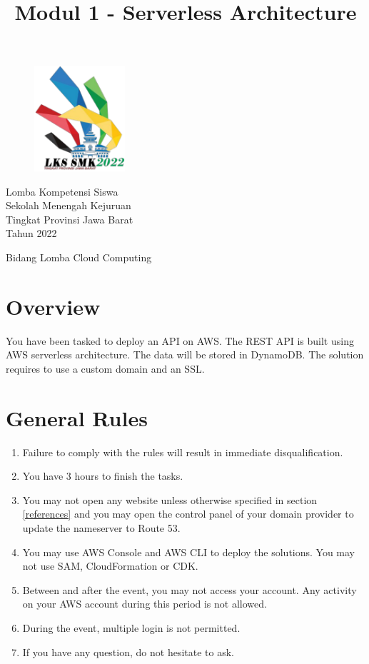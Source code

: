 \documentclass{article}
\title{Modul 1 - Serverless Architecture}
\author{}
\begin{document}
\lstset{language=Bash,upquote=true}
\begin{figure}[h]
\centering
\includegraphics[width=0.3\textwidth]{logo.png}
\end{figure}
\centering
{\huge
Lomba Kompetensi Siswa\\
Sekolah Menengah Kejuruan\\
Tingkat Provinsi Jawa Barat\\
Tahun 2022\\
\vspace{10mm} %
}
\vspace{30mm} %
{\let\newpage\relax\maketitle}
\vspace{30mm} %
{\LARGE Bidang Lomba Cloud Computing}

\raggedright
\newpage

\section{Overview}
You have been tasked to deploy an API on AWS. The REST API is built using AWS serverless architecture. The data will be stored in DynamoDB. The solution requires to use a custom domain and an SSL.
\section{General Rules}
\begin{enumerate}
    \item Failure to comply with the rules will result in immediate disqualification.
    \item You have 3 hours to finish the tasks.
    \item You may not open any website unless otherwise specified in section \ref{references} and you may open the control panel of your domain provider to update the nameserver to Route 53.
    \item You may use AWS Console and AWS CLI to deploy the solutions. You may not use SAM, CloudFormation or CDK.
    \item Between and after the event, you may not access your account. Any activity on your AWS account during this period is not allowed.
    \item During the event, multiple login is not permitted.
    \item If you have any question, do not hesitate to ask.
\end{enumerate}
\end{document}
